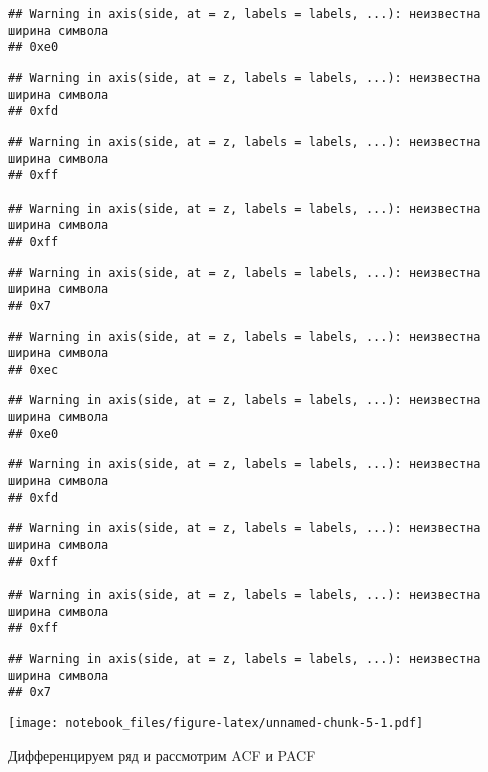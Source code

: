 \documentclass[
]{article}
\begin{document}
\begin{verbatim}
## Warning in axis(side, at = z, labels = labels, ...): неизвестна ширина символа
## 0xe0
\end{verbatim}

\begin{verbatim}
## Warning in axis(side, at = z, labels = labels, ...): неизвестна ширина символа
## 0xfd
\end{verbatim}

\begin{verbatim}
## Warning in axis(side, at = z, labels = labels, ...): неизвестна ширина символа
## 0xff

## Warning in axis(side, at = z, labels = labels, ...): неизвестна ширина символа
## 0xff
\end{verbatim}

\begin{verbatim}
## Warning in axis(side, at = z, labels = labels, ...): неизвестна ширина символа
## 0x7
\end{verbatim}

\begin{verbatim}
## Warning in axis(side, at = z, labels = labels, ...): неизвестна ширина символа
## 0xec
\end{verbatim}

\begin{verbatim}
## Warning in axis(side, at = z, labels = labels, ...): неизвестна ширина символа
## 0xe0
\end{verbatim}

\begin{verbatim}
## Warning in axis(side, at = z, labels = labels, ...): неизвестна ширина символа
## 0xfd
\end{verbatim}

\begin{verbatim}
## Warning in axis(side, at = z, labels = labels, ...): неизвестна ширина символа
## 0xff

## Warning in axis(side, at = z, labels = labels, ...): неизвестна ширина символа
## 0xff
\end{verbatim}

\begin{verbatim}
## Warning in axis(side, at = z, labels = labels, ...): неизвестна ширина символа
## 0x7
\end{verbatim}

\texttt{[image: notebook\_files/figure-latex/unnamed-chunk-5-1.pdf]}

Дифференцируем ряд и рассмотрим ACF и PACF
\end{document}
